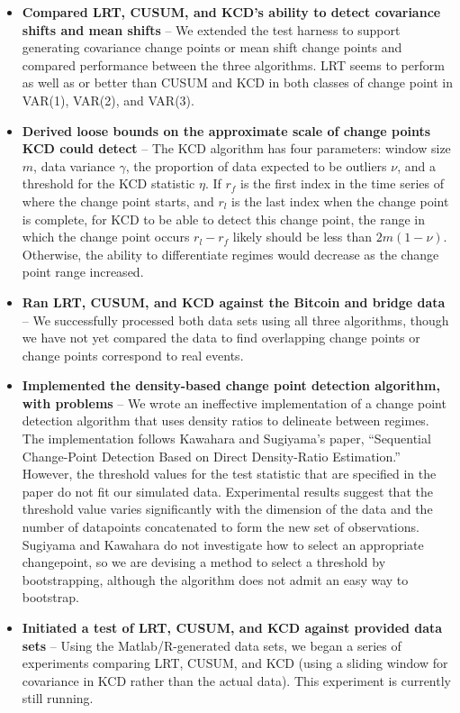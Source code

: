 \documentclass[10pt,letterpaper]{article}
\begin{document}
\begin{itemize}
\item \textbf{Compared LRT, CUSUM, and KCD's ability to detect covariance shifts and mean shifts} -- We extended the test harness to support generating covariance change points or mean shift change points and compared performance between the three algorithms. LRT seems to perform as well as or better than CUSUM and KCD in both classes of change point in VAR(1), VAR(2), and VAR(3).

\item \textbf{Derived loose bounds on the approximate scale of change points KCD could detect} -- The KCD algorithm has four parameters: window size $m$, data variance $\gamma$, the proportion of data expected to be outliers $\nu$, and a threshold for the KCD statistic $\eta$. If $r_f$ is the first index in the time series of where the change point starts, and $r_l$ is the last index when the change point is complete, for KCD to be able to detect this change point, the range in which the change point occurs $r_l - r_f$ likely should be less than $2m(1-\nu)$. Otherwise, the ability to differentiate regimes would decrease as the change point range increased.

\item \textbf{Ran LRT, CUSUM, and KCD against the Bitcoin and bridge data} -- We successfully processed both data sets using all three algorithms, though we have not yet compared the data to find overlapping change points or change points correspond to real events.

\item \textbf{Implemented the density-based change point detection algorithm, with problems} -- We wrote an ineffective implementation of a change point detection algorithm that uses density ratios to delineate between regimes. The implementation follows Kawahara and Sugiyama's paper, ``Sequential Change-Point Detection Based on Direct Density-Ratio Estimation.'' However, the threshold values for the test statistic that are specified in the paper do not fit our simulated data. Experimental results suggest that the threshold value varies significantly with the dimension of the data and the number of datapoints concatenated to form the new set of observations. Sugiyama and Kawahara do not investigate how to select an appropriate changepoint, so we are devising a method to select a threshold by bootstrapping, although the algorithm does not admit an easy way to bootstrap.

\item \textbf{Initiated a test of LRT, CUSUM, and KCD against provided data sets} -- Using the Matlab/R-generated data sets, we began a series of experiments comparing LRT, CUSUM, and KCD (using a sliding window for covariance in KCD rather than the actual data). This experiment is currently still running.

\end{itemize}
\end{document}
